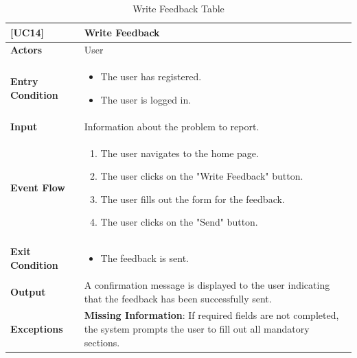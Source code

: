 \begin{table}[H]
    \centering
    \renewcommand{\arraystretch}{1.5}
    \begin{tabular}{|p{4cm}|p{11cm}|}
    \hline
    \rowcolor{bluepoli!40}
    \textbf{[UC14]} & \textbf{Write Feedback} \\ \hline \hline
    \textbf{Actors} & User \\ \hline
    \textbf{Entry Condition} & 
    {\setlength{\leftmargini}{1.1em}
    \begin{itemize}
        \item The user has registered.
        \item The user is logged in.
    \end{itemize}} \\ \hline
    \textbf{Input} & Information about the problem to report. \\ \hline
    \textbf{Event Flow} & 
    {\setlength{\leftmargini}{1.4em}
    \begin{enumerate}
        \item The user navigates to the home page.
        \item The user clicks on the "Write Feedback" button.
        \item The user fills out the form for the feedback.
        \item The user clicks on the "Send" button.
    \end{enumerate}} \\ \hline
    \textbf{Exit Condition} & 
    {\setlength{\leftmargini}{1.1em}
    \begin{itemize}
        \item The feedback is sent.
    \end{itemize}} \\ \hline
    \textbf{Output} & 
    A confirmation message is displayed to the user indicating that the feedback has been successfully sent. \\ \hline
    \textbf{Exceptions} & 
    \textbf{Missing Information}: If required fields are not completed, the system prompts the user to fill out all mandatory sections. \\ \hline
    \end{tabular}
    \caption{Write Feedback Table}
\end{table}


